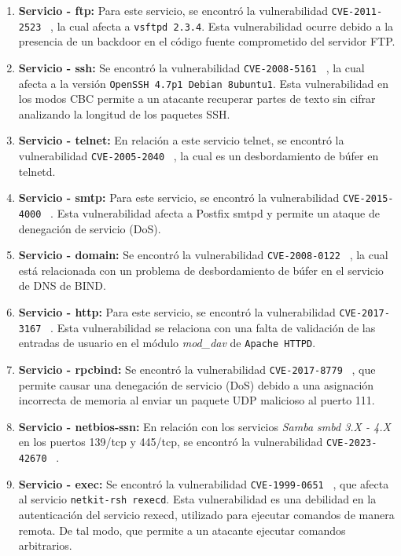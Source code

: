 \documentclass[a4paper,12pt]{article} %
\begin{document}
    \begin{enumerate}
        \item \textbf{Servicio - ftp: }Para este servicio, se encontró la vulnerabilidad \texttt{CVE-2011-2523} ~\cite{cve7}, la cual afecta a \texttt{vsftpd 2.3.4}. Esta vulnerabilidad ocurre debido a la presencia de un backdoor en el código fuente comprometido del servidor FTP.
        \item \textbf{Servicio - ssh: } Se encontró la vulnerabilidad \texttt{CVE-2008-5161}  ~\cite{cve8}, la cual afecta a la versión \texttt{OpenSSH 4.7p1 Debian 8ubuntu1}. Esta vulnerabilidad en los modos CBC permite a un atacante recuperar partes de texto sin cifrar analizando la longitud de los paquetes SSH.
        \item \textbf{Servicio - telnet: } En relación a este servicio telnet, se encontró la vulnerabilidad \texttt{CVE-2005-2040}  ~\cite{cve9}, la cual es un desbordamiento de búfer en telnetd.
        \item \textbf{Servicio - smtp: } Para este servicio, se encontró la vulnerabilidad \texttt{CVE-2015-4000} ~\cite{cve10}. Esta vulnerabilidad afecta a Postfix smtpd y permite un ataque de denegación de servicio (DoS).
        \item \textbf{Servicio - domain: } Se encontró la vulnerabilidad \texttt{CVE-2008-0122} ~\cite{cve11}, la cual está relacionada con un problema de desbordamiento de búfer en el servicio de DNS de BIND.
        \item \textbf{Servicio - http: } Para este servicio, se encontró la vulnerabilidad \texttt{CVE-2017-3167} ~\cite{cve12}. Esta vulnerabilidad se relaciona con una falta de validación de las entradas de usuario en el módulo \textit{mod\_dav} de \texttt{Apache HTTPD}.
        \item \textbf{Servicio - rpcbind: } Se encontró la vulnerabilidad \texttt{CVE-2017-8779} ~\cite{cve13}, que permite causar una denegación de servicio (DoS) debido a una asignación incorrecta de memoria al enviar un paquete UDP malicioso al puerto 111.
        \item \textbf{Servicio - netbios-ssn: }  En relación con los servicios \textit{Samba smbd 3.X - 4.X} en los puertos 139/tcp y 445/tcp, se encontró la vulnerabilidad \texttt{CVE-2023-42670} ~\cite{cve14}.
        \item \textbf{Servicio - exec: } Se encontró la vulnerabilidad \texttt{CVE-1999-0651} ~\cite{cve15}, que afecta al servicio \texttt{netkit-rsh rexecd}. Esta vulnerabilidad es una debilidad en la autenticación del servicio rexecd, utilizado para ejecutar comandos de manera remota. De tal modo, que permite a un atacante ejecutar comandos arbitrarios.

\end{enumerate}
\end{document}
